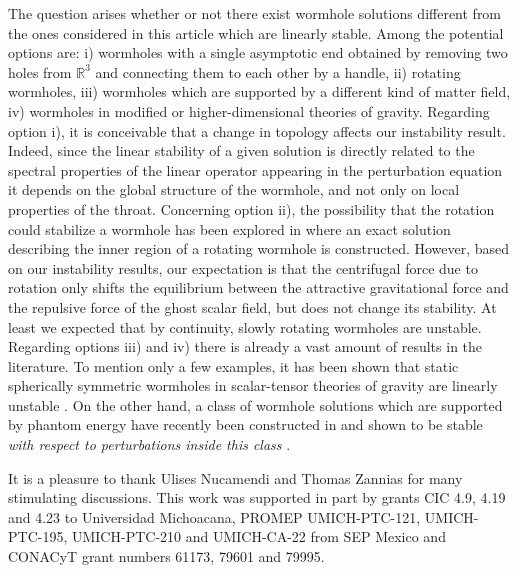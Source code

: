 \documentclass[           %
               showpacs,            %
               preprintnumbers,     %
               aps,                 %
               prd,                 %
               superscriptaddress,      %
               nofootinbib,         %
               tightenlines,        %
               floats,floatfix      %
               ]{revtex4}
\newcommand{\Real}{\mathbb{R}}
\begin{document}
The question arises whether or not there exist wormhole solutions
different from the ones considered in this article which are linearly
stable. Among the potential options are: i) wormholes with a single
asymptotic end obtained by removing two holes from $\Real^3$ and
connecting them to each other by a handle, ii) rotating wormholes,
iii) wormholes which are supported by a different kind of matter
field, iv) wormholes in modified or higher-dimensional theories of
gravity. Regarding option i), it is conceivable that a change in
topology affects our instability result. Indeed, since the linear
stability of a given solution is directly related to the spectral
properties of the linear operator appearing in the perturbation
equation it depends on the global structure of the wormhole, and not
only on local properties of the throat. Concerning option ii), the
possibility that the rotation could stabilize a wormhole has been
explored in \cite{tMdN06} where an exact solution describing the inner
region of a rotating wormhole is constructed. However, based on our
instability results, our expectation is that the centrifugal force due
to rotation only shifts the equilibrium between the attractive
gravitational force and the repulsive force of the ghost scalar field,
but does not change its stability. At least we expected that by
continuity, slowly rotating wormholes are unstable. Regarding options
iii) and iv) there is already a vast amount of results in the
literature. To mention only a few examples, it has been shown that
static spherically symmetric wormholes in scalar-tensor theories of
gravity are linearly unstable \cite{kBsG04,kBaS07}. On the other hand,
a class of wormhole solutions which are supported by phantom energy
have recently been constructed in \cite{sS05,fL05} and shown to be
stable {\em with respect to perturbations inside this class}
\cite{fL05b}.




\acknowledgments

It is a pleasure to thank Ulises Nucamendi and Thomas Zannias for many
stimulating discussions. This work was supported in part by grants CIC
4.9, 4.19 and 4.23 to Universidad Michoacana, PROMEP UMICH-PTC-121,
UMICH-PTC-195, UMICH-PTC-210 and UMICH-CA-22 from SEP Mexico and
CONACyT grant numbers 61173, 79601 and 79995.




\end{document}
